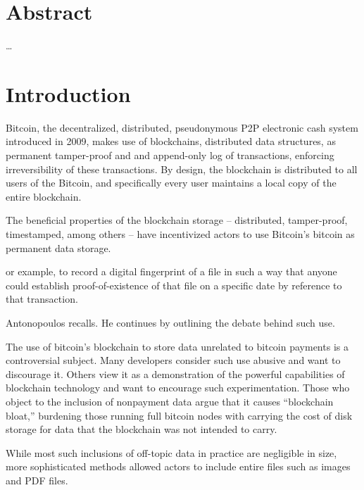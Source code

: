 \documentclass[a4paper,11pt,titlepage]{scrbook}
\newcommand{\blankpage}{
 \clearpage{\pagestyle{empty}\cleardoublepage}
}
\begin{document}
\frontmatter
{}

\setmarginsrb{3cm}{1cm}{3cm}{1cm}{6mm}{7mm}{5mm}{15mm}
\chapter*{Abstract}
\dots

\tableofcontents
\blankpage

\mainmatter
{}
\chapter{Introduction}

Bitcoin, the decentralized, distributed, pseudonymous P2P electronic cash system introduced in 2009, makes use of blockchains, distributed data structures, as permanent tamper-proof and and append-only log of transactions, enforcing irreversibility of these transactions.
By design, the blockchain is distributed to all users of the Bitcoin, and specifically every user maintains a local copy of the entire blockchain.

The beneficial properties of the blockchain storage – distributed, tamper-proof, timestamped, among others – have incentivized actors to use Bitcoin's bitcoin as permanent data storage.
\begin{displayquote}
    or example, to record a digital fingerprint
    of a file in such a way that anyone could establish proof-of-existence of that file on a specific date by reference to that transaction.
\end{displayquote}
Antonopoulos recalls. He continues by outlining the debate behind such use.
\begin{displayquote}
    The use of bitcoin’s blockchain to store data unrelated to bitcoin payments is a controversial subject.
    Many developers consider such use abusive and want to discourage it.
    Others view it as a demonstration of the powerful capabilities of blockchain technology and want to encourage such experimentation. Those who object to the inclusion of nonpayment data argue that it causes \enquote{blockchain bloat,} burdening those running full bitcoin nodes with carrying the cost of disk storage for data that the blockchain was not intended to carry.
\end{displayquote}
While most such inclusions of off-topic data in practice are negligible in size, more sophisticated methods allowed actors to include entire files such as images and PDF files.
\end{document}
